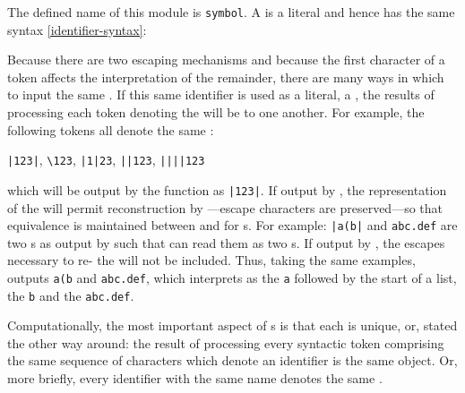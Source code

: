 %
\begin{optDefinition}
The defined name of this module is {\tt symbol}.
%
%
A  is a literal  and hence has the same syntax
\ref{identifier-syntax}:

\Syntax
\label{symbol-syntax}
%
%

Because there are two escaping mechanisms and because the first character of a
token affects the interpretation of the remainder, there are many ways in which
to input the same .  If this same identifier is used as a
literal, \ie a , the results of processing each token denoting the
 will be  to one another.  For example, the
following tokens all denote the same :
%
\begin{center}
\verb+|123|+, \verb+\123+, \verb+|1|23+, \verb+||123+, \verb+||||123+
\end{center}
%
which will be output by the function  as \verb+|123|+.  If
output by , the representation of the  will
permit reconstruction by ---escape characters are
preserved---so that equivalence is maintained between  and
 for s.  For example: \verb+|a(b|+ and
\verb+abc.def+ are two s as output by  such
that  can read them as two s.  If output by
, the escapes necessary to re- the
 will not be included.  Thus, taking the same examples,
 outputs \verb+a(b+ and \verb+abc.def+, which
 interprets as the  \verb+a+ followed by the
start of a list, the  \verb+b+ and the 
\verb+abc.def+.

Computationally, the most important aspect of s is that each is
unique, or, stated the other way around: the result of processing
every syntactic token comprising the same sequence of characters which
denote an identifier is the same object.  Or, more briefly, every
identifier with the same name denotes the same .


\end{optDefinition}
